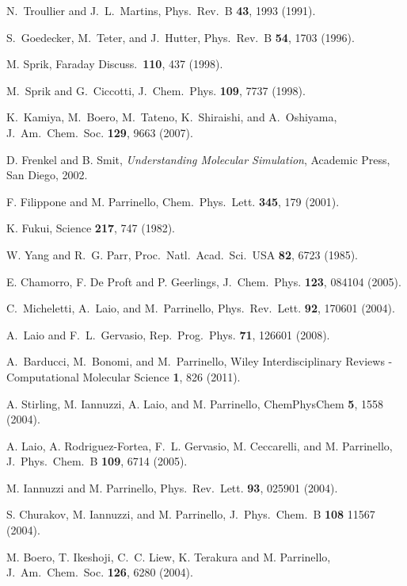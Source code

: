 \documentclass[twoside,10pt,titlepage,a4paper]{article}
\begin{document}
\begin{thebibliography}{999}
    N.~Troullier and J.~L.~Martins,
    Phys.~Rev.~B {\bf 43}, 1993 (1991).

    S.~Goedecker, M.~Teter, and J.~Hutter,
    Phys.~Rev.~B {\bf 54}, 1703 (1996).

    M. Sprik, Faraday Discuss.\ {\bf 110}, 437 (1998).

 M.~Sprik and G.~Ciccotti,
    J.~Chem.~Phys. {\bf 109}, 7737 (1998).

    K.~Kamiya, M.~Boero, M.~Tateno, K.~Shiraishi, and A.~Oshiyama,
    J.~Am.~Chem.~Soc. {\bf 129}, 9663 (2007).

    D. Frenkel and B. Smit,
    {\em Understanding Molecular Simulation},
    Academic Press, San Diego, 2002.

 F. Filippone and M. Parrinello,
     Chem.~Phys.~Lett. {\bf 345}, 179 (2001).

 K. Fukui, Science {\bf 217}, 747 (1982).

 W. Yang and R.~G. Parr,
     Proc.~Natl.~Acad.~Sci.~USA {\bf 82}, 6723 (1985).

 E. Chamorro, F. De Proft and P. Geerlings,
     J.~Chem.~Phys. {\bf 123}, 084104 (2005).

 C.~Micheletti,  A.~Laio, and M.~Parrinello,
      Phys.~Rev.~Lett. {\bf 92}, 170601 (2004).

 A.~Laio and F.~L.~Gervasio,
      Rep.~Prog.~Phys. {\bf 71}, 126601 (2008).

 A.~Barducci, M.~Bonomi, and M.~Parrinello,
      Wiley Interdisciplinary Reviews - Computational Molecular Science
      {\bf 1}, 826 (2011).

 A. Stirling, M. Iannuzzi, A. Laio, and M. Parrinello,
       ChemPhysChem {\bf 5}, 1558 (2004).

 A. Laio, A. Rodriguez-Fortea, F.~L. Gervasio, M. Ceccarelli,
       and M. Parrinello, J.~Phys.~Chem.~B {\bf 109}, 6714 (2005).

 M. Iannuzzi and M. Parrinello,
         Phys.~Rev.~Lett. {\bf 93}, 025901 (2004).

 S. Churakov, M. Iannuzzi, and M. Parrinello,
       J.~Phys.~Chem.~B {\bf 108} 11567 (2004).

 M. Boero, T. Ikeshoji, C.~C. Liew, K. Terakura and M. Parrinello,
      J.~Am.~Chem.~Soc. {\bf 126}, 6280 (2004).


\end{thebibliography}
\end{document}
